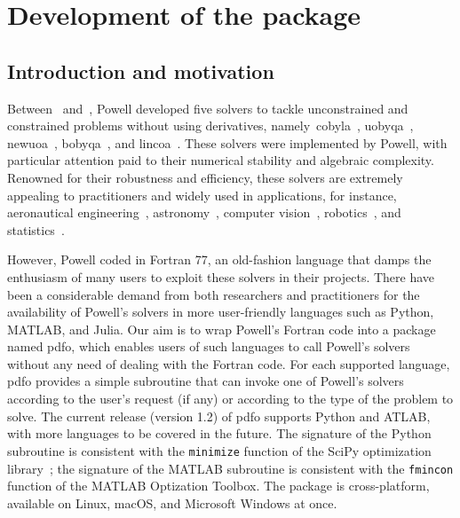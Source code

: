 %
%
%
\chapter{Development of the  package}
\label{ch:pdfo}

\section{Introduction and motivation}

Between~\citeyear{Powell_1994} and~\citeyear{Powell_2015}, Powell developed five solvers to tackle unconstrained and constrained problems without using derivatives, namely~\gls{cobyla}~\cite{Powell_1994}, \gls{uobyqa}~\cite{Powell_2002}, \gls{newuoa}~\cite{Powell_2006}, \gls{bobyqa}~\cite{Powell_2009}, and \gls{lincoa}~\cite{Powell_2015}.
These solvers were implemented by Powell, with particular attention paid to their numerical stability and algebraic complexity.
Renowned for their robustness and efficiency, these solvers are extremely appealing to practitioners and widely used in applications, for instance, aeronautical engineering~\cite{Gallard_Etal_2018}, astronomy~\cite{Biviano_Etal_2013,Mamon_Biviano_Boue_2013}, computer vision~\cite{Izadinia_Shan_Seitz_2017}, robotics~\cite{Mombaur_Truong_Laumond_2010}, and statistics~\cite{Bates_Etal_2015}.

However, Powell coded in Fortran 77, an old-fashion language that damps the enthusiasm of many users to exploit these solvers in their projects.
There have been a considerable demand from both researchers and practitioners for the availability of Powell's solvers in more user-friendly languages such as Python, MATLAB, and Julia.
Our aim is to wrap Powell's Fortran code into a package named \gls{pdfo}, which enables users of such languages to call Powell's solvers without any need of dealing with the Fortran code.
For each supported language, \gls{pdfo} provides a simple subroutine that can invoke one of Powell's solvers according to the user's request (if any) or according to the type of the problem to solve.
The current release (version 1.2) of \gls{pdfo} supports Python and ATLAB, with more languages to be covered in the future.
The signature of the Python subroutine is consistent with the \texttt{minimize} function of the SciPy optimization library~\cite{Virtanen_Etal_2020};
the signature of the MATLAB subroutine is consistent with the \texttt{fmincon} function of the MATLAB Optization Toolbox.
The package is cross-platform, available on Linux, macOS, and Microsoft Windows at once.

